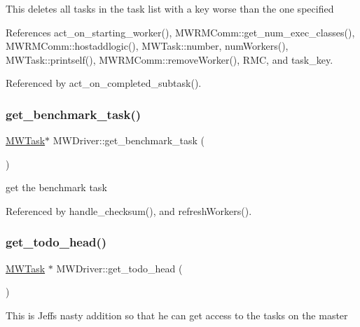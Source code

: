 This deletes all tasks in the task list with a key worse than the one specified 

References act\+\_\+on\+\_\+starting\+\_\+worker(), M\+W\+R\+M\+Comm\+::get\+\_\+num\+\_\+exec\+\_\+classes(), M\+W\+R\+M\+Comm\+::hostaddlogic(), M\+W\+Task\+::number, num\+Workers(), M\+W\+Task\+::printself(), M\+W\+R\+M\+Comm\+::remove\+Worker(), R\+MC, and task\+\_\+key.



Referenced by act\+\_\+on\+\_\+completed\+\_\+subtask().

\mbox{\label{classMWDriver_a77e388c0446e7c42a8c6d0ee544a29b6}} 
\subsubsection{\texorpdfstring{get\+\_\+benchmark\+\_\+task()}{get\_benchmark\_task()}}
{\footnotesize\ttfamily \hyperlink{classMWTask}{M\+W\+Task}$\ast$ M\+W\+Driver\+::get\+\_\+benchmark\+\_\+task (\begin{DoxyParamCaption}{ }\end{DoxyParamCaption})\hspace{0.3cm}{\ttfamily [inline]}}

get the benchmark task 

Referenced by handle\+\_\+checksum(), and refresh\+Workers().

\mbox{\label{classMWDriver_aded3f8d1e5aa80a2492387533195d0aa}} 
\subsubsection{\texorpdfstring{get\+\_\+todo\+\_\+head()}{get\_todo\_head()}}
{\footnotesize\ttfamily \hyperlink{classMWTask}{M\+W\+Task} $\ast$ M\+W\+Driver\+::get\+\_\+todo\+\_\+head (\begin{DoxyParamCaption}{ }\end{DoxyParamCaption})}

This is Jeff\textquotesingle{}s nasty addition so that he can get access to the tasks on the master \mbox{\label{classMWDriver_acf0edc86b06b46968114c8bb770791b2}} 
